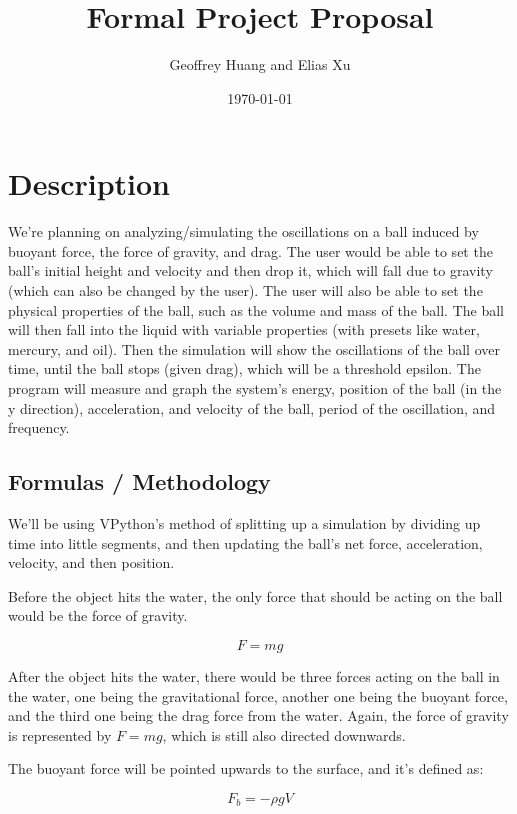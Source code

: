 \documentclass{article}
\begin{document}
\title{Formal Project Proposal}
\author{Geoffrey Huang and Elias Xu}
\date{\today}
\maketitle
\setlength{\parindent}{0pt}

\section{Description}

We’re planning on analyzing/simulating the oscillations on a ball induced by buoyant force, the force of gravity, and drag. The user would be able to set the ball's initial height and velocity and then drop it, which will fall due to gravity (which can also be changed by the user). The user will also be able to set the physical properties of the ball, such as the volume and mass of the ball. The ball will then fall into the liquid with variable properties (with presets like water, mercury, and oil). Then the simulation will show the oscillations of the ball over time, until the ball stops (given drag), which will be a threshold epsilon. The program will measure and graph the system's energy, position of the ball (in the y direction), acceleration, and velocity of the ball, period of the oscillation, and frequency.


\subsection{Formulas / Methodology}

We'll be using VPython's method of splitting up a simulation by dividing up time into little segments, and then updating the ball's net force, acceleration, velocity, and then position.

Before the object hits the water, the only force that should be acting on the ball would be the force of gravity.

$$F = mg$$

After the object hits the water, there would be three forces acting on the ball in the water, one being the gravitational force, another one being the buoyant force, and the third one being the drag force from the water. Again, the force of gravity is represented by $F = mg$, which is still also directed downwards.

The buoyant force will be pointed upwards to the surface, and it's defined as:

$$F_b = -\rho gV$$
\end{document}
